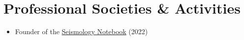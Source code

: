 \section{Professional Societies \& Activities}

\begin{itemize}
\item Founder of the \href{https://github.com/Seismology-Notebook}{Seismology Notebook} (2022)
\end{itemize}
